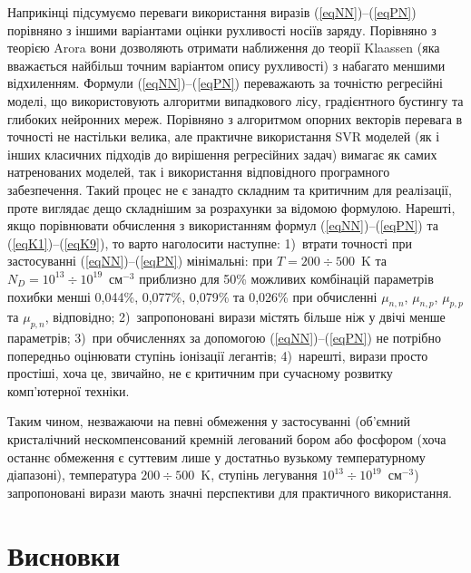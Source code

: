 \documentclass[14pt,a4paper,titlepage,oneside]{book}
\numberwithin{equation}{part}
\begin{document}
Наприкінці підсумуємо переваги використання виразів (\ref{eqNN})--(\ref{eqPN}) порівняно з іншими варіантами оцінки рухливості носіїв заряду.
Порівняно з теорією Arora вони дозволяють отримати наближення до теорії Klaassen (яка вважається найбільш точним варіантом опису рухливості)
з набагато меншими відхиленням.
Формули (\ref{eqNN})--(\ref{eqPN}) переважають за точністю регресійні моделі, що використовують алгоритми 
випадкового лісу, градієнтного бустингу та глибоких нейронних мереж.
Порівняно з алгоритмом опорних векторів перевага в точності не настільки велика, але
практичне використання SVR моделей (як і інших класичних підходів до вирішення регресійних задач)
вимагає як самих натренованих моделей, так і використання відповідного програмного забезпечення.
Такий процес не є занадто складним та критичним для реалізації, проте виглядає дещо складнішим за розрахунки за відомою формулою.
Нарешті, якщо порівнювати обчислення з використанням формул (\ref{eqNN})--(\ref{eqPN}) та (\ref{eqK1})--(\ref{eqK9}),
то варто наголосити наступне:
1)~втрати точності при застосуванні (\ref{eqNN})--(\ref{eqPN}) мінімальні:
при $T=200\div500$~K та $N_D=10^{13}\div10^{19}$~см$^{-3}$ приблизно для 50\% можливих комбінацій параметрів
похибки менші  0,044\%, 0,077\%, 0,079\% та 0,026\% при обчисленні 
$\mu_{n,n}$, $\mu_{n,p}$, $\mu_{p,p}$ та $\mu_{p,n}$, відповідно;
2)~запропоновані вирази містять більше ніж у двічі менше параметрів;
3)~при обчисленнях за допомогою (\ref{eqNN})--(\ref{eqPN}) не потрібно попередньо оцінювати ступінь іонізації легантів;
4)~нарешті, вирази просто простіші, хоча це, звичайно, не є критичним при сучасному розвитку комп'ютерної техніки.

Таким чином, незважаючи на певні обмеження у застосуванні 
(об'ємний кристалічний нескомпенсований кремній легований бором або фосфором
(хоча останнє обмеження є суттевим лише у достатньо вузькому температурному діапазоні), 
температура $200\div500$~K, ступінь легування $10^{13}\div10^{19}$~см$^{-3}$)
запропоновані вирази мають значні перспективи для практичного використання. 




\chapter*{Висновки}
  \setcounter{page}{32}
\end{document}

